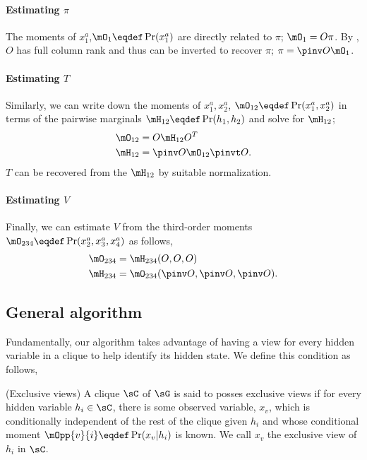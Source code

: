 \paragraph{Estimating $\pi$}
The moments of $x^a_1$,$\mO_1 \eqdef \Pr(x^a_1)$ are directly related to
  $\pi$; $\mO_1 = O \pi$. 
By , $O$ has full column rank and thus can be
  inverted to recover $\pi$; $\pi = \pinv O \mO_1$.

\paragraph{Estimating $T$}
Similarly, we can write down the moments of $x^a_1, x^a_2$, $\mO_{12}
  \eqdef \Pr(x^a_1, x^a_2)$ in terms of the pairwise marginals $\mH_{12}
  \eqdef \Pr(h_1, h_2)$ and solve for $\mH_{12}$;
\begin{align*}
  \mO_{12} &= O \mH_{12} O^T \\
  \mH_{12} &= \pinv O \mO_{12} \pinvt O.
\end{align*}
$T$ can be recovered from the $\mH_{12}$ by suitable normalization.

\paragraph{Estimating $V$}
Finally, we can estimate $V$ from the third-order moments $\mO_{234} \eqdef \Pr(x^a_2, x^a_3, x^a_4)$ as
follows,
\begin{align*}
  \mO_{234} &= \mH_{234}(O, O, O) \\
  \mH_{234} &= \mO_{234}(\pinv O, \pinv O, \pinv O).
\end{align*}

\subsection{General algorithm}

Fundamentally, our algorithm takes advantage of having a view for every
  hidden variable in a clique to help identify its hidden state. We define this condition as follows,
\begin{property}(Exclusive views)
  \label{prop:exclusive-views}
A clique $\sC$ of $\sG$ is said to posses exclusive views if for every hidden variable $h_i \in \sC$,
  there is some observed variable, $x_{v}$, which is conditionally
  independent of the rest of the clique given $h_i$ and whose conditional
  moment $\mOpp{v}{i} \eqdef \Pr(x_{v} | h_i)$ is known. 
We call $x_v$ the exclusive view of $h_i$ in $\sC$.
\end{property}

